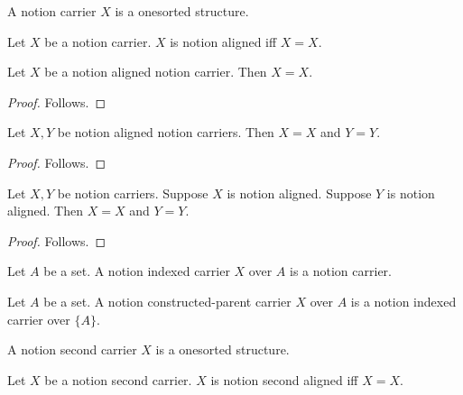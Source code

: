 \begin{struct}\label{notion_carrier}
    A notion carrier $X$ is a onesorted structure.
\end{struct}

\begin{definition}\label{notion_aligned}
    Let $X$ be a notion carrier.
    $X$ is notion aligned iff $X=X$.
\end{definition}

\begin{proposition}\label{notion_aligned_carrier}
    Let $X$ be a notion aligned notion carrier.
    Then $X=X$.
\end{proposition}
\begin{proof}
    Follows.
\end{proof}

\begin{proposition}\label{grouped_notion_aligned_carriers}
    Let $X,Y$ be notion aligned notion carriers.
    Then $X=X$ and $Y=Y$.
\end{proposition}
\begin{proof}
    Follows.
\end{proof}

\begin{proposition}\label{grouped_notion_facts_reach_later_headers}
    Let $X,Y$ be notion carriers.
    Suppose $X$ is notion aligned.
    Suppose $Y$ is notion aligned.
    Then $X=X$ and $Y=Y$.
\end{proposition}
\begin{proof}
    Follows.
\end{proof}

\begin{struct}\label{notion_indexed_carrier}
    Let $A$ be a set.
    A notion indexed carrier $X$ over $A$ is a notion carrier.
\end{struct}

\begin{struct}\label{notion_constructed_parent_carrier}
    Let $A$ be a set.
    A notion constructed-parent carrier $X$ over $A$ is a notion indexed
        carrier over $\{A\}$.
\end{struct}

\begin{struct}\label{notion_second_carrier}
    A notion second carrier $X$ is a onesorted structure.
\end{struct}

\begin{definition}\label{notion_second_aligned}
    Let $X$ be a notion second carrier.
    $X$ is notion second aligned iff $X=X$.
\end{definition}

